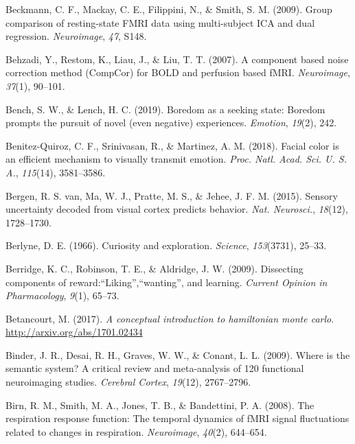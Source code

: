 \documentclass[11pt,american,a4paper,oneside,]{memoir} %
\begin{document}
\leavevmode\hypertarget{ref-Beckmann2009-rs}{}%
Beckmann, C. F., Mackay, C. E., Filippini, N., \& Smith, S. M. (2009). Group comparison of resting-state FMRI data using multi-subject ICA and dual regression. \emph{Neuroimage}, \emph{47}, S148.

\leavevmode\hypertarget{ref-Behzadi2007-eb}{}%
Behzadi, Y., Restom, K., Liau, J., \& Liu, T. T. (2007). A component based noise correction method (CompCor) for BOLD and perfusion based fMRI. \emph{Neuroimage}, \emph{37}(1), 90--101.

\leavevmode\hypertarget{ref-bench2019boredom}{}%
Bench, S. W., \& Lench, H. C. (2019). Boredom as a seeking state: Boredom prompts the pursuit of novel (even negative) experiences. \emph{Emotion}, \emph{19}(2), 242.

\leavevmode\hypertarget{ref-Benitez-Quiroz2018-vr}{}%
Benitez-Quiroz, C. F., Srinivasan, R., \& Martinez, A. M. (2018). Facial color is an efficient mechanism to visually transmit emotion. \emph{Proc. Natl. Acad. Sci. U. S. A.}, \emph{115}(14), 3581--3586.

\leavevmode\hypertarget{ref-Van_Bergen2015-kl}{}%
Bergen, R. S. van, Ma, W. J., Pratte, M. S., \& Jehee, J. F. M. (2015). Sensory uncertainty decoded from visual cortex predicts behavior. \emph{Nat. Neurosci.}, \emph{18}(12), 1728--1730.

\leavevmode\hypertarget{ref-berlyne1966curiosity}{}%
Berlyne, D. E. (1966). Curiosity and exploration. \emph{Science}, \emph{153}(3731), 25--33.

\leavevmode\hypertarget{ref-berridge2009dissecting}{}%
Berridge, K. C., Robinson, T. E., \& Aldridge, J. W. (2009). Dissecting components of reward:``Liking'',``wanting'', and learning. \emph{Current Opinion in Pharmacology}, \emph{9}(1), 65--73.

\leavevmode\hypertarget{ref-Betancourt2017-rj}{}%
Betancourt, M. (2017). \emph{A conceptual introduction to hamiltonian monte carlo}. \url{http://arxiv.org/abs/1701.02434}

\leavevmode\hypertarget{ref-binder2009semantic}{}%
Binder, J. R., Desai, R. H., Graves, W. W., \& Conant, L. L. (2009). Where is the semantic system? A critical review and meta-analysis of 120 functional neuroimaging studies. \emph{Cerebral Cortex}, \emph{19}(12), 2767--2796.

\leavevmode\hypertarget{ref-Birn2008-ti}{}%
Birn, R. M., Smith, M. A., Jones, T. B., \& Bandettini, P. A. (2008). The respiration response function: The temporal dynamics of fMRI signal fluctuations related to changes in respiration. \emph{Neuroimage}, \emph{40}(2), 644--654.
\end{document}
